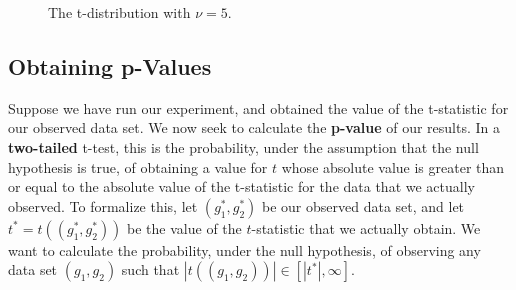 \documentclass[11pt]{article}
\theoremstyle{definition}
\theoremstyle{remark}
\begin{document}

\begin{figure}[]
\centering
{}
\caption{The t-distribution with $\nu=5$.}\label{fig:tdist}
\end{figure}


\subsection{Obtaining p-Values}
Suppose we have run our experiment, and obtained the value of the t-statistic for our observed data set. We now seek to calculate the \textbf{p-value} of our results. In a \textbf{two-tailed} t-test, this is the probability, under the assumption that the null hypothesis is true, of obtaining a value for $t$ whose absolute value is greater than or equal to the absolute value of the t-statistic for the data that we actually observed. To formalize this, let $(g^{*}_{1},g^{*}_{2})$ be our observed data set, and let $t^{*}=t((g^{*}_{1},g^{*}_{2}))$ be the value of the $t$-statistic that we actually obtain. We want to calculate the probability, under the null hypothesis, of observing any data set $(g_{1},g_{2})$ such that $|t((g_{1},g_{2}))|\in[|t^{*}|,\infty]$.\par 
\end{document}
